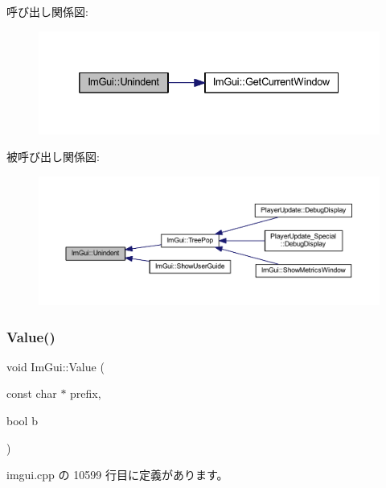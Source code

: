 呼び出し関係図\+:\nopagebreak
\begin{figure}[H]
\begin{center}
\leavevmode
\includegraphics[width=332pt]{namespace_im_gui_ad577d36753634c9bbdc3750b0e5217f5_cgraph}
\end{center}
\end{figure}
被呼び出し関係図\+:\nopagebreak
\begin{figure}[H]
\begin{center}
\leavevmode
\includegraphics[width=350pt]{namespace_im_gui_ad577d36753634c9bbdc3750b0e5217f5_icgraph}
\end{center}
\end{figure}
\mbox{\label{namespace_im_gui_a1b3324308e43eeded5c3599fa0f03e85}} 
\subsubsection{\texorpdfstring{Value()}{Value()}\hspace{0.1cm}{\footnotesize\ttfamily [1/4]}}
{\footnotesize\ttfamily void Im\+Gui\+::\+Value (\begin{DoxyParamCaption}\item[{const char $\ast$}]{prefix,  }\item[{bool}]{b }\end{DoxyParamCaption})}



 imgui.\+cpp の 10599 行目に定義があります。

